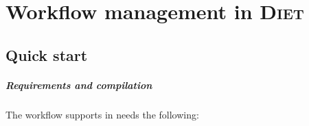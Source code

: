
\chapter{Workflow management in \textsc{Diet}}

\section{Quick start}


\paragraph{Requirements and compilation}

The workflow supports in \diet needs the following:

